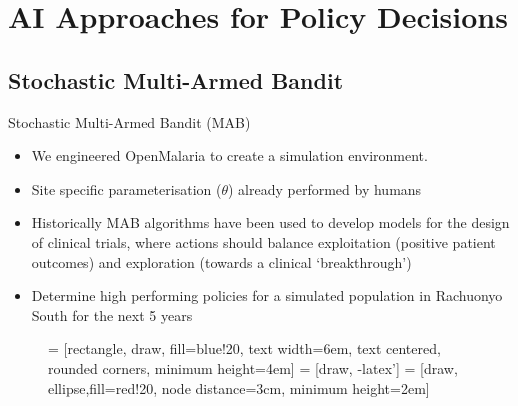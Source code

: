 \documentclass{beamer}
\begin{document}
\section{AI Approaches for Policy Decisions}

\subsection{Stochastic Multi-Armed Bandit}
\begin{frame}{Stochastic Multi-Armed Bandit (MAB)}

\begin{itemize}
\item We engineered OpenMalaria to create a simulation environment.
\item Site specific parameterisation ($\theta$) already performed by humans \cite{Stuckey2012}
\item Historically MAB algorithms have been used to develop models for the design of clinical trials, where actions should balance exploitation (positive patient outcomes) and exploration (towards a clinical `breakthrough')
\item  Determine high performing policies for a simulated population in Rachuonyo South for the next 5 years
\end{itemize}

\begin{figure}[!t]
\centering
{} = [rectangle, draw, fill=blue!20, 
    text width=6em, text centered, rounded corners, minimum height=4em]
 = [draw, -latex']
 = [draw, ellipse,fill=red!20, node distance=3cm,
    minimum height=2em]
    
\label{fig_flow}
\end{figure}

\end{frame}
\end{document}
